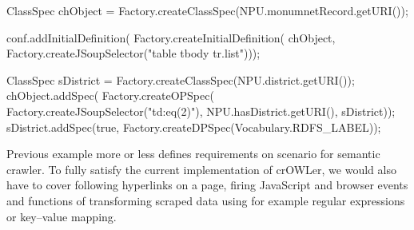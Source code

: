 \begtt
ClassSpec chObject = Factory.createClassSpec(NPU.monumnetRecord.getURI());

conf.addInitialDefinition(
       Factory.createInitialDefinition(
         chObject,
         Factory.createJSoupSelector("table tbody tr.list")));

ClassSpec sDistrict = Factory.createClassSpec(NPU.district.getURI());
chObject.addSpec(
           Factory.createOPSpec(
             Factory.createJSoupSelector("td:eq(2)"),
                                         NPU.hasDistrict.getURI(),
                                         sDistrict));
sDistrict.addSpec(true, Factory.createDPSpec(Vocabulary.RDFS_LABEL));
\endtt

Previous example more or less defines requirements on scenario for semantic
crawler. To fully satisfy the current implementation of crOWLer, we would also
have to cover following hyperlinks on a page, firing JavaScript and browser
events and functions of transforming scraped data using for example regular
expressions or key--value mapping. 

%


%
%
%
%

